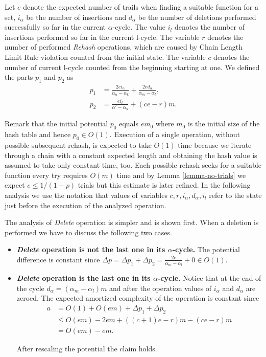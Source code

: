 Let $e$ denote the expected number of trails when finding a suitable function for a set, $i_{\alpha}$ be the number of insertions and $d_{\alpha}$ be the number of deletions performed successfully so far in the current $\alpha$-cycle. The value $i_l$ denotes the number of insertions performed so far in the current l-cycle. The variable $r$ denotes the number of performed \emph{Rehash} operations, which are caused by Chain Length Limit Rule violation counted from the initial state. The variable $c$ denotes the number of current l-cycle counted from the beginning starting at one. We defined the parts $p_1$ and $p_2$ as
\[
\begin{split}
p_1 & = \frac{2ei_{\alpha}}{\alpha_u - \alpha_k} + \frac{2ed_{\alpha}}{\alpha_m - \alpha_l}, \\
p_2 & = \frac{ei_{l}}{\alpha' - \alpha_u} + (ce - r) m.
\end{split}
\]

Remark that the initial potential $p_0$ equals $em_0$ where $m_0$ is the initial size of the hash table and hence $p_0 \in O(1)$. Execution of a single operation, without possible subsequent rehash, is expected to take $O(1)$ time because we iterate through a chain with a constant expected length and obtaining the hash value is assumed to take only constant time, too. Each possible rehash seeks for a suitable function every try requires $O(m)$ time and by Lemma \ref{lemma-no-trials} we expect $e \leq 1 / (1 - p)$ trials but this estimate is later refined. In the following analysis we use the notation that values of variables $c, r, i_\alpha, d_\alpha, i_l$ refer to the state just before the execution of the analyzed operation.

The analysis of \emph{Delete} operation is simpler and is shown first. When a deletion is performed we have to discuss the following two cases.
\begin{itemize}
\item \textbf{\emph{Delete} operation is not the last one in its $\alpha$-cycle.} The potential difference is constant since $\Delta p = \Delta p_1 + \Delta p_2 = \frac{2e}{\alpha_m - \alpha_l} + 0 \in O(1)$.

\item \textbf{\emph{Delete} operation is the last one in its $\alpha$-cycle.} Notice that at the end of the cycle $d_\alpha = (\alpha_m - \alpha_l)m$ and after the operation values of $i_\alpha$ and $d_\alpha$ are zeroed. The expected amortized complexity of the operation is constant since
\[
\begin{split}
a
	& = O(1) + O(em) + \Delta p_1 + \Delta p_2 \\
	& \leq O(em) -2em + ((c + 1)e - r)m - (ce - r)m \\
	& = O(em) - em.
\end{split}
\]

After rescaling the potential the claim holds.
\end{itemize}

